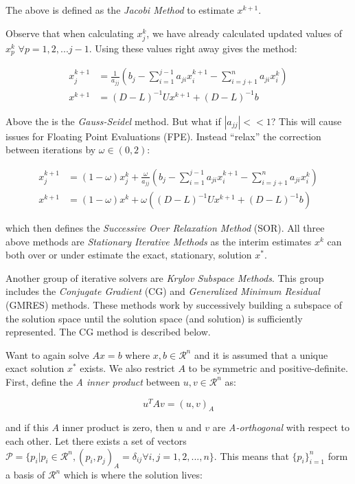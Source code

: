 \documentclass[a4paper, 12pt]{article}
\begin{document}
\noindent
The above is defined as the \emph{Jacobi Method} to estimate $x^{k+1}$.


Observe that when calculating $x_j^k$, 
we have already calculated updated values of $x_p^k$ $\forall p=1,2,...j-1$.
Using these values right away gives the method:

\begin{align}
x^{k+1}_j &= \frac{1}{a_{jj}} \left(b_j - \sum_{i=1}^{j-1} a_{ji}x^{k+1}_i - \sum_{i=j+1}^{n} a_{ji}x^k_i \right) \\
x^{k+1} &= (D-L)^{-1}Ux^{k+1} + (D-L)^{-1}b 
\end{align}

\noindent
Above the is the \emph{Gauss-Seidel} method. 
But what if $ |a_{jj}| << 1$?
This will cause issues for Floating Point Evaluations (FPE).
Instead ``relax'' the correction between iterations
by $\omega\in(0,2)$:

\begin{align}
x^{k+1}_j &= (1-\omega)x^k_j + \frac{\omega}{a_{jj}} \left(b_j - \sum_{i=1}^{j-1} a_{ji}x^{k+1}_i - \sum_{i=j+1}^{n} a_{ji}x^k_i \right) \\
x^{k+1} &= (1-\omega)x^k + \omega \left( (D-L)^{-1}Ux^{k+1} + (D-L)^{-1}b \right)
\end{align}

\noindent
which then defines the \emph{Successive Over Relaxation Method} (SOR).
All three above methods are \emph{Stationary Iterative Methods}
as the interim estimates $x^k$ can both over or under estimate
the exact, stationary, solution $x^*$.

Another group of iterative solvers are \emph{Krylov Subspace Methods}.
This group includes the \emph{Conjugate Gradient} (CG)
and \emph{Generalized Minimum Residual} (GMRES) methods.
These methods work by successively building a subspace
of the solution space until the solution space 
(and solution) is sufficiently represented.
The CG method is described below.

Want to again solve $Ax=b$ where $x,b\in\mathcal{R}^n$ and
it is assumed that a unique exact solution $x^*$ exists.
We also restrict $A$ to be symmetric and positive-definite.
First, define the \emph{A inner product} between $u,v\in\mathcal{R}^n$ as:

\begin{equation}
u^T A v = (u, v)_A
\end{equation}

\noindent 
and if this $A$ inner product is zero, then $u$ and $v$ 
are \emph{A-orthogonal} with respect to each other.
Let there exists a set of vectors 
$\mathcal{P} = \{p_i | p_i \in \mathcal{R}^n, (p_i,p_j)_A=\delta_{ij}\forall i,j=1,2,...,n \}$.
This means that $\{p_i\}_{i=1}^n$ form a basis of $\mathcal{R}^n$
which is where the solution lives:
\end{document}
